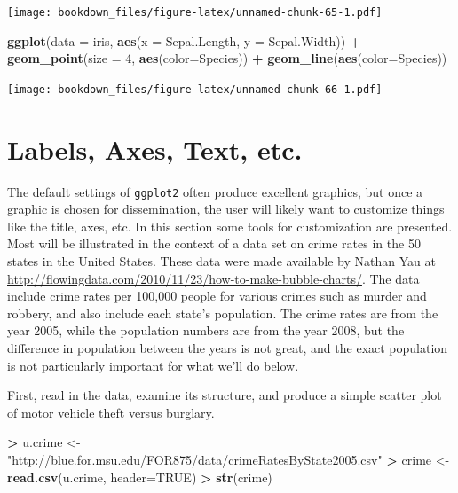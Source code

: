\documentclass[]{krantz}
\makeatletter
\newenvironment{Shaded}{\begin{snugshade}}{\end{snugshade}}
\newcommand{\KeywordTok}[1]{\textcolor[rgb]{0.27,0.27,0.27}{\textbf{#1}}}
\newcommand{\DataTypeTok}[1]{\textcolor[rgb]{0.27,0.27,0.27}{#1}}
\newcommand{\DecValTok}[1]{\textcolor[rgb]{0.06,0.06,0.06}{#1}}
\newcommand{\StringTok}[1]{\textcolor[rgb]{0.5,0.5,0.5}{#1}}
\newcommand{\OtherTok}[1]{\textcolor[rgb]{0.37,0.37,0.37}{#1}}
\newcommand{\OperatorTok}[1]{\textcolor[rgb]{0.43,0.43,0.43}{\textbf{#1}}}
\newcommand{\NormalTok}[1]{#1}
\newenvironment{kframe}{%
\medskip{}
\setlength{\fboxsep}{.8em}
 \def\at@end@of@kframe{}%
 \ifinner\ifhmode%
  \def\at@end@of@kframe{\end{minipage}}%
  \begin{minipage}{\columnwidth}%
 \fi\fi%
 \def\FrameCommand##1{\hskip\@totalleftmargin \hskip-\fboxsep
 \colorbox{shadecolor}{##1}\hskip-\fboxsep
     \hskip-\linewidth \hskip-\@totalleftmargin \hskip\columnwidth}%
 \MakeFramed {\advance\hsize-\width
   \@totalleftmargin\z@ \linewidth\hsize
   \@setminipage}}%
 {\par\unskip\endMakeFramed%
 \at@end@of@kframe}
\renewenvironment{Shaded}{\begin{kframe}}{\end{kframe}}
\makeatother
\begin{document}
\texttt{[image: bookdown\_files/figure-latex/unnamed-chunk-65-1.pdf]}

\begin{Shaded}
\begin{Highlighting}[]
\KeywordTok{ggplot}\NormalTok{(}\DataTypeTok{data =}\NormalTok{ iris, }\KeywordTok{aes}\NormalTok{(}\DataTypeTok{x =}\NormalTok{ Sepal.Length, }\DataTypeTok{y =}\NormalTok{ Sepal.Width)) }\OperatorTok{+}\StringTok{ }
\StringTok{    }\KeywordTok{geom_point}\NormalTok{(}\DataTypeTok{size =} \DecValTok{4}\NormalTok{, }\KeywordTok{aes}\NormalTok{(}\DataTypeTok{color=}\NormalTok{Species)) }\OperatorTok{+}\StringTok{ }
\StringTok{    }\KeywordTok{geom_line}\NormalTok{(}\KeywordTok{aes}\NormalTok{(}\DataTypeTok{color=}\NormalTok{Species))}
\end{Highlighting}
\end{Shaded}

\texttt{[image: bookdown\_files/figure-latex/unnamed-chunk-66-1.pdf]}

\section{Labels, Axes, Text, etc.}\label{labels-axes-text-etc.}

The default settings of \texttt{ggplot2} often produce excellent
graphics, but once a graphic is chosen for dissemination, the user will
likely want to customize things like the title, axes, etc. In this
section some tools for customization are presented. Most will be
illustrated in the context of a data set on crime rates in the 50 states
in the United States. These data were made available by Nathan Yau at
\url{http://flowingdata.com/2010/11/23/how-to-make-bubble-charts/}. The
data include crime rates per 100,000 people for various crimes such as
murder and robbery, and also include each state's population. The crime
rates are from the year 2005, while the population numbers are from the
year 2008, but the difference in population between the years is not
great, and the exact population is not particularly important for what
we'll do below.

First, read in the data, examine its structure, and produce a simple
scatter plot of motor vehicle theft versus burglary.

\begin{Shaded}
\begin{Highlighting}[]
\OperatorTok{>}\StringTok{ }\NormalTok{u.crime <-}\StringTok{ "http://blue.for.msu.edu/FOR875/data/crimeRatesByState2005.csv"}
\OperatorTok{>}\StringTok{ }\NormalTok{crime <-}\StringTok{ }\KeywordTok{read.csv}\NormalTok{(u.crime, }\DataTypeTok{header=}\OtherTok{TRUE}\NormalTok{)}
\OperatorTok{>}\StringTok{ }\KeywordTok{str}\NormalTok{(crime)}
\end{Highlighting}
\end{Shaded}
\end{document}
